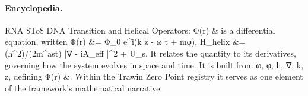 \paragraph{Encyclopedia.}
RNA \$To\$ DNA Transition and Helical Operators: Φ(r) \& is a differential equation, written Φ(r) \&= Φ\_0 e\textasciicircum{}i(k z - ω t + mφ), H\_helix \&= (ħ\textasciicircum{}2)/(2m\textasciicircum{}ast) |∇ - iA\_eff |\textasciicircum{}2 + U\_s. It relates the quantity to its derivatives, governing how the system evolves in space and time. It is built from ω, φ, ħ, ∇, k, z, defining Φ(r) \&. Within the Trawin Zero Point registry it serves as one element of the framework's mathematical narrative.
